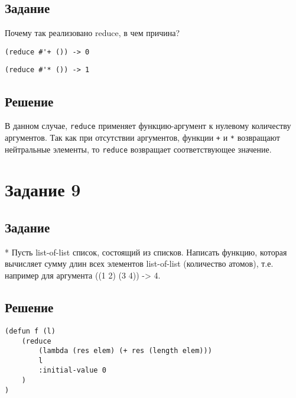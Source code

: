 \subsection*{Задание}
Почему так реализовано reduce, в чем причина? 

\begin{code}
\begin{verbatim}
(reduce #'+ ()) -> 0
\end{verbatim}
\end{code}

\begin{code}
\begin{verbatim}
(reduce #'* ()) -> 1
\end{verbatim}
\end{code}

\subsection*{Решение}
В данном случае, \texttt{reduce} применяет функцию-аргумент к нулевому количеству аргументов. Так как при отсутствии аргументов, функции \texttt{+} и \texttt{*} возвращают нейтральные элементы, то \texttt{reduce} возвращает соответствующее значение.

\section{Задание 9}
\subsection*{Задание}
* Пусть list-of-list список, состоящий из списков. Написать функцию, которая вычисляет сумму длин всех элементов list-of-list (количество атомов), т.е. например для аргумента
((1 2) (3 4)) -> 4.

\subsection*{Решение}
\begin{code}
\begin{verbatim}
(defun f (l)
	(reduce
		(lambda (res elem) (+ res (length elem)))
		l
		:initial-value 0
	)
)
\end{verbatim}
\end{code}

\newpage